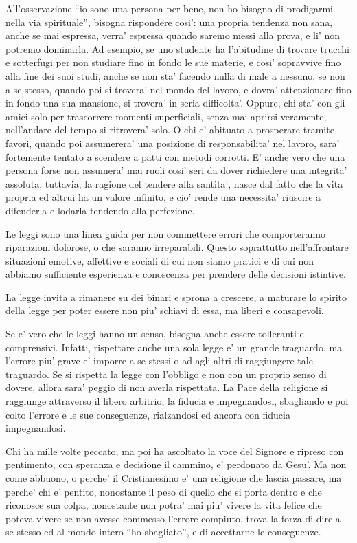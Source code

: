 All'osservazione ``io sono una persona per bene, non ho bisogno di prodigarmi nella via spirituale'', bisogna rispondere cosi': una propria tendenza non sana, anche se mai espressa, verra' espressa quando saremo messi alla prova, e li' non potremo dominarla. Ad esempio, se uno studente ha l'abitudine di trovare trucchi e sotterfugi per non studiare fino in fondo le sue materie, e cosi' sopravvive fino alla fine dei suoi studi, anche se non sta' facendo nulla di male a nessuno, se non a se stesso, quando poi si trovera' nel mondo del lavoro, e dovra' attenzionare fino in fondo una sua mansione, si trovera' in seria difficolta'. Oppure, chi sta' con gli amici solo per trascorrere momenti superficiali, senza mai aprirsi veramente, nell'andare del tempo si ritrovera' solo. O chi e' abituato a prosperare tramite favori, quando poi assumerera' una posizione di responsabilita' nel lavoro, sara' fortemente tentato a scendere a patti con metodi corrotti. E' anche vero che una persona forse non assumera' mai ruoli cosi' seri da dover richiedere una integrita' assoluta, tuttavia, la ragione del tendere alla santita', nasce dal fatto che la vita propria ed altrui ha un valore infinito, e cio' rende una necessita' riuscire a difenderla e lodarla tendendo alla perfezione.

Le leggi sono una linea guida per non commettere errori che comporteranno riparazioni dolorose, o che saranno irreparabili. Questo soprattutto nell'affrontare situazioni emotive, affettive e sociali di cui non siamo pratici e di cui non abbiamo sufficiente esperienza e conoscenza per prendere delle decisioni istintive.

La legge invita a rimanere su dei binari e sprona a crescere, a maturare lo spirito della legge per poter essere non piu' schiavi di essa, ma liberi e consapevoli.

Se e' vero che le leggi hanno un senso, bisogna anche essere tolleranti e comprensivi. Infatti, rispettare anche una sola legge e' un grande traguardo, ma l'errore piu' grave e' imporre a se stessi o ad agli altri di raggiungere tale traguardo. Se si rispetta la legge con l'obbligo e non con un proprio senso di dovere, allora sara' peggio di non averla rispettata. La Pace della religione si raggiunge attraverso il libero arbitrio, la fiducia e impegnandosi, sbagliando e poi colto l'errore e le sue conseguenze, rialzandosi ed ancora con fiducia impegnandosi.

Chi ha mille volte peccato, ma poi ha ascoltato la voce del Signore e ripreso con pentimento, con speranza e decisione il cammino, e' perdonato da Gesu'. Ma non come abbuono, o perche' il Cristianesimo e' una religione che lascia passare, ma perche' chi e' pentito, nonostante il peso di quello che si porta dentro e che riconosce sua colpa, nonostante non potra' mai piu' vivere la vita felice che poteva vivere se non avesse commesso l'errore compiuto, trova la forza di dire a se stesso ed al mondo intero ``ho sbagliato'', e di accettarne le conseguenze. 

